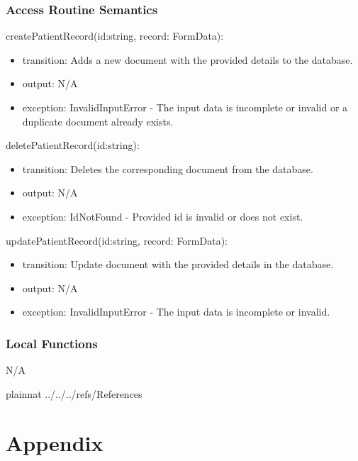 \documentclass[12pt, titlepage]{article}
\begin{document}
\subsubsection{Access Routine Semantics}

\noindent createPatientRecord(id:string, record: FormData):
\begin{itemize}
\item transition: Adds a new document with the provided details to the database.
\item output: N/A
\item exception: InvalidInputError - The input data is incomplete or invalid or a duplicate document already exists.
\end{itemize}

\noindent deletePatientRecord(id:string):
\begin{itemize}
\item transition: Deletes the corresponding document from the database.
\item output: N/A
\item exception: IdNotFound - Provided id is invalid or does not exist.
\end{itemize}

\noindent updatePatientRecord(id:string, record: FormData):
\begin{itemize}
\item transition: Update document with the provided details in the database.
\item output: N/A
\item exception: InvalidInputError - The input data is incomplete or invalid.
\end{itemize}

\subsubsection{Local Functions}

N/A

\newpage


 {plainnat}
 {../../../refs/References}

\newpage

\section{Appendix} \label{Appendix}


\newpage{}
\end{document}
